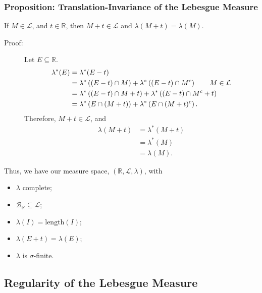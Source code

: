 \documentclass[10pt]{extarticle}
\newcommand{\R}{\mathbb{R}}
\begin{document}
  \subsubsection{Proposition: Translation-Invariance of the Lebesgue Measure}%
  If $M\in \mathcal{L}$, and $t\in \R$, then $M + t\in \mathcal{L}$ and $\lambda(M + t) = \lambda(M)$.
  \begin{description}
    \item[Proof:] Let $E\subseteq \R$.
      \begin{align*}
        \lambda^{\ast}(E) &= \lambda^{\ast}(E - t)\\
                          &= \lambda^{\ast}\left((E - t)\cap M\right) + \lambda^{\ast}\left((E-t)\cap M^{c}\right) \tag*{$M\in \mathcal{L}$}\\
                          &= \lambda^{\ast}\left((E-t)\cap M + t\right) + \lambda^{\ast}\left((E-t)\cap M^{c} + t\right)\\
                          &= \lambda^{\ast}\left(E\cap (M+t)\right) + \lambda^{\ast}\left(E\cap (M+t)^{c}\right).
      \end{align*}
      Therefore, $M+t\in \mathcal{L}$, and
      \begin{align*}
        \lambda(M+t) &= \lambda^{\ast}(M+t)\\
                     &= \lambda^{\ast}(M)\\
                     &= \lambda(M).
      \end{align*}
  \end{description}
  Thus, we have our measure space, $(\R,\mathcal{L},\lambda)$, with
  \begin{itemize}
    \item $\lambda$ complete;
    \item $\mathcal{B}_{\R}\subseteq \mathcal{L}$;
    \item $\lambda(I) = \text{length}(I)$;
    \item $\lambda(E+t) = \lambda(E)$;
    \item $\lambda$ is $\sigma$-finite.
  \end{itemize}
  \subsection{Regularity of the Lebesgue Measure}%
\end{document}
